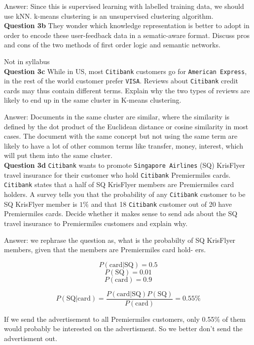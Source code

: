 \documentclass[11pt,a4paper]{report}
\begin{document}
\begin{multicols*}{2}
\noindent Answer: Since this is supervised learning with labelled training data, we should use kNN. k-means clustering is an unsupervised clustering algorithm. \\

\noindent \textbf{Question 3b} They wonder which knowledge representation is better to adopt in order to encode these user-feedback data in a sematic-aware format. Discuss pros and cons of the two methods of first order logic and semantic networks. 

\noindent Not in syllabus \\

\noindent \textbf{Question 3c} While in US, most \verb|Citibank| customers go for \verb|American Express|, in the rest of the world customer prefer \verb|VISA|. Reviews about \verb|Citibank| credit cards may thus contain different terms. Explain why the two types of reviews are likely to end up in the same cluster in K-means clustering.

\noindent Answer: Documents in the same cluster are similar, where the similarity is defined by the dot product of the Euclidean distance or cosine similarity in most cases. The document with the same concept but not using the same term are likely to have a lot of other common terms like transfer, money, interest, which will put them into the same cluster. \\

\noindent \textbf{Question 3d} \verb|Citibank|  wants to promote \verb|Singapore Airlines| (SQ) KrisFlyer travel insurance for their customer who hold \verb|Citibank| Premiermiles cards. \verb|Citibank| states that a half of SQ KrisFlyer members are Premiermiles card holders. A survey tells you that the probability of any \verb|Citibank| customer to be SQ KrisFlyer member is $1\%$ and that 18 \verb|Citibank| customer out of 20 have Premiermiles cards. Decide whether it makes sense to send ads about the SQ travel insurance to Premiermiles customers and explain why. 

\noindent Answer: we rephrase the question as, what is the probabilty of SQ KrisFlyer members, given that the members are Premiermiles card hold- ers.

$$P(\text{card} | \text{SQ}) = 0.5$$
$$P(\text{SQ}) = 0.01$$
$$P(\text{card}) = 0.9$$

$$P(\text{SQ} | \text{card}) = \frac{P(\text{card} | \text{SQ}) P(\text{SQ})}{P(\text{card})} = 0.55\%$$

\noindent If we send the advertisement to all Premiermiles customers, only 0.55\% of them would probably be interested on the advertisment. So we better don't send the advertisment out. \\


\end{multicols*}
\end{document}
